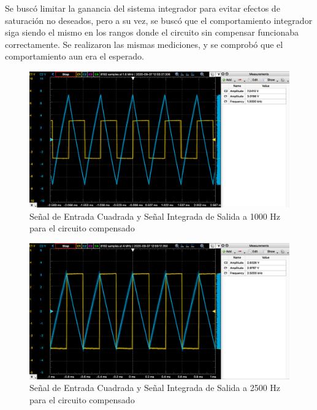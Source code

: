 Se buscó limitar la ganancia del sistema integrador para evitar efectos de saturación no deseados, pero a su vez, se buscó que el comportamiento integrador
siga siendo el mismo en los rangos donde el circuito sin compensar funcionaba correctamente. Se realizaron las mismas mediciones, y se comprobó que el comportamiento
aun era el esperado.

\begin{figure}[H]
    \centering 
    \includegraphics [scale=0.45] {../Ejercicio3-CircuitoIntegradoresyDerivadores/Imagenes/cuadrada-compensado-1000.png} 
    \caption{Señal de Entrada Cuadrada y Señal Integrada de Salida a 1000 Hz para el circuito compensado }
    \label{fig:emptyPlotTool}
\end{figure}

\begin{figure}[H]
    \centering 
    \includegraphics [scale=0.45] {../Ejercicio3-CircuitoIntegradoresyDerivadores/Imagenes/cuadrada-compensado -2500.png} 
    \caption{Señal de Entrada Cuadrada y Señal Integrada de Salida a 2500 Hz para el circuito compensado }
    \label{fig:emptyPlotTool}
\end{figure}

